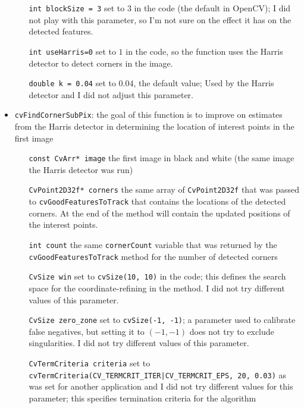 \documentclass{article}
\begin{document}
\begin{itemize}
\begin{itemize}
\item[\texttt{int blockSize = 3}] set to $3$ in the code (the default in
OpenCV); I did not play with this parameter, so I'm not sure on the effect it
has on the detected features. 
 
\item[\texttt{int useHarris=0}] set to $1$ in the code, so the function uses
the Harris detector to detect corners in the image. 

\item[\texttt{double k = 0.04}] set to $0.04$, the default value; Used by the
Harris detector and I did not adjust this parameter. 

\end{itemize} 

\item \verb|cvFindCornerSubPix|: the goal of this function is to improve on
estimates from the Harris detector in determining the location of interest
points in the first image 

\begin{itemize}

\item[\texttt{const CvArr* image}] the first image in black and white (the same
image the Harris detector was run)

\item[\texttt{CvPoint2D32f* corners}] the same array of \texttt{CvPoint2D32f}
that was passed to \texttt{cvGoodFeaturesToTrack} that contains the locations
of the detected corners. At the end of the method will contain the updated
positions of the interest points.

\item[\texttt{int count}] the same \texttt{cornerCount} variable that was
returned by the \texttt{cvGoodFeaturesToTrack} method for the number of
detected corners

\item[\texttt{CvSize win}] set to \texttt{cvSize(10, 10)} in the code; this
defines the search space for the coordinate-refining in the method. I did not
try different values of this parameter.

\item[\texttt{CvSize zero\_zone}] set to \texttt{cvSize(-1, -1)}; a parameter
used to calibrate false negatives, but setting it to $(-1, -1)$ does not try to
exclude singularities. I did not try different values of this parameter. 

\item[\texttt{CvTermCriteria criteria}] set to
\texttt{cvTermCriteria(CV\_TERMCRIT\_ITER|CV\_TERMCRIT\_EPS, 20, 0.03)} as was set
for another application and I did not try different values for this parameter;
this specifies termination criteria for the algorithm


\end{itemize}
\end{itemize}
\end{document}
